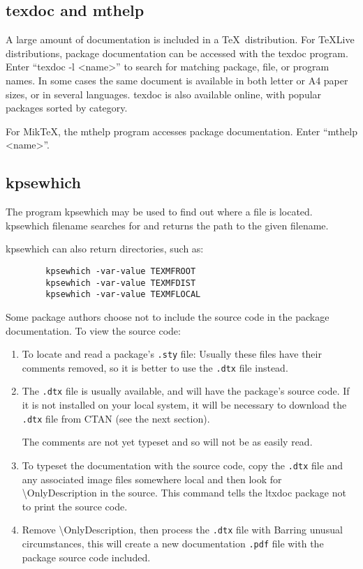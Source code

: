 \documentclass{article}
\DeclareRobustCommand{\cs}[1]{{\tt \char`\\#1}}
\def\\{ }%
\def\pkg#1{#1}%
\def\cs#1{\textbackslash#1}%
\def\TeX{TeX}%
\def\prog#1{\detokenize{#1}}%
\renewcommand*{\pkg}[1]{#1}
\renewcommand*{\prog}[1]{#1}
\renewcommand*{\TeX}{TeX}
\begin{document}
\subsection{\prog{texdoc} and \prog{mthelp}}

A large amount of documentation is included in a \TeX\ distribution.
For TeXLive distributions, package documentation
can be accessed with the \prog{texdoc} program.
Enter ``\prog{texdoc -l <name>}'' to search for
matching package, file, or program names.  In some cases the same document
is available in both letter or A4 paper sizes, or in several languages.
\prog{texdoc} is also available online,
with popular packages sorted by category. 

For Mik\TeX, the \prog{mthelp} program accesses package documentation.
Enter ``\prog{mthelp <name>}''.

\subsection{\prog{kpsewhich}}

The program \prog{kpsewhich} may be used to find out where a file is
located.  \prog{kpsewhich filename} searches for and returns the
path to the given filename.

\prog{kpsewhich} can also return directories, such as:
\begin{verbatim}
        kpsewhich -var-value TEXMFROOT
        kpsewhich -var-value TEXMFDIST
        kpsewhich -var-value TEXMFLOCAL
\end{verbatim}
\medskip

Some package authors choose not to include the source code in the
package documentation.  To view the source code:

\begin{enumerate}
\item To locate and read a package's \verb+.sty+ file:
Usually these files have their comments removed,
so it is better to use the \verb+.dtx+ file instead.
\item The \verb+.dtx+ file is usually available,
and will have the package's source code.
If it is not installed on your local system, it will
be necessary to download the \verb+.dtx+ file from
CTAN (see the next section).

The comments are not yet typeset and so
will not be as easily read.
\item To typeset the documentation with the source code,
copy the \verb+.dtx+ file and any associated image files
somewhere local and then look for
\cs{OnlyDescription}
in the source.
This command tells the \pkg{ltxdoc} package not to print the source code.
\item Remove \cs{OnlyDescription}, then process the \verb+.dtx+ file with
Barring unusual circumstances, this will create a new documentation
\verb+.pdf+ file with the package source code included.
\end{enumerate}
\end{document}
